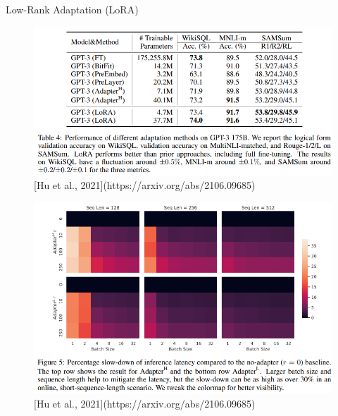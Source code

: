 \begin{frame}[allowframebreaks]{Low-Rank Adaptation (LoRA)}
\begin{figure}
    \centering
    \includegraphics[width=\linewidth,height=\textheight,keepaspectratio]{images/adv-img-gen/lora-5.png} \\
    \small [Hu et al., 2021](https://arxiv.org/abs/2106.09685)
\end{figure}

\framebreak

\begin{figure}
    \centering
    \includegraphics[width=\linewidth,height=\textheight,keepaspectratio]{images/adv-img-gen/lora-6.png} \\
    \small [Hu et al., 2021](https://arxiv.org/abs/2106.09685)
\end{figure}
\end{frame}